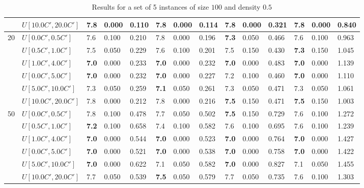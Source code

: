 \begin{table}[h]
{\begin{tabular}{|l|l||l|l|l||l|l|l||l|l|l||l|l|l|}
       & $U[10.0C',20.0C']$ & \textbf{7.8} & 0.000 & 0.110 & \textbf{7.8} & 0.000 & 0.114 & \textbf{7.8} & 0.000 & 0.321 & \textbf{7.8} & 0.000 & 0.840 \\
      \hline\hline
      \multirow{6}{*}{20} & $U[0.0C',0.5C']$ & 7.6 & 0.100 & 0.210 & 7.8 & 0.000 & 0.196 & \textbf{7.3} & 0.050 & 0.466 & 7.6 & 0.100 & 0.963 \\
       & $U[0.5C',1.0C']$ & 7.5 & 0.050 & 0.229 & 7.6 & 0.100 & 0.201 & 7.5 & 0.150 & 0.430 & \textbf{7.3} & 0.150 & 1.045 \\
       & $U[1.0C',4.0C']$ & \textbf{7.0} & 0.000 & 0.233 & \textbf{7.0} & 0.000 & 0.232 & \textbf{7.0} & 0.000 & 0.483 & \textbf{7.0} & 0.000 & 1.139 \\
       & $U[0.0C',5.0C']$ & \textbf{7.0} & 0.000 & 0.232 & \textbf{7.0} & 0.000 & 0.227 & 7.2 & 0.100 & 0.460 & \textbf{7.0} & 0.000 & 1.110 \\
       & $U[5.0C',10.0C']$ & 7.3 & 0.050 & 0.259 & \textbf{7.1} & 0.050 & 0.261 & 7.3 & 0.050 & 0.471 & 7.3 & 0.050 & 1.061 \\
       & $U[10.0C',20.0C']$ & 7.8 & 0.000 & 0.212 & 7.8 & 0.000 & 0.216 & \textbf{7.5} & 0.150 & 0.471 & \textbf{7.5} & 0.150 & 1.003 \\
      \hline\hline
      \multirow{6}{*}{50} & $U[0.0C',0.5C']$ & 7.8 & 0.100 & 0.478 & 7.7 & 0.050 & 0.502 & \textbf{7.5} & 0.150 & 0.729 & 7.6 & 0.100 & 1.272 \\
       & $U[0.5C',1.0C']$ & \textbf{7.2} & 0.100 & 0.658 & 7.4 & 0.100 & 0.582 & 7.6 & 0.100 & 0.695 & 7.6 & 0.100 & 1.239 \\
       & $U[1.0C',4.0C']$ & \textbf{7.0} & 0.000 & 0.544 & \textbf{7.0} & 0.000 & 0.523 & \textbf{7.0} & 0.000 & 0.764 & \textbf{7.0} & 0.000 & 1.427 \\
       & $U[0.0C',5.0C']$ & \textbf{7.0} & 0.000 & 0.521 & \textbf{7.0} & 0.000 & 0.538 & \textbf{7.0} & 0.000 & 0.758 & \textbf{7.0} & 0.000 & 1.422 \\
       & $U[5.0C',10.0C']$ & \textbf{7.0} & 0.000 & 0.622 & 7.1 & 0.050 & 0.582 & \textbf{7.0} & 0.000 & 0.827 & 7.1 & 0.050 & 1.455 \\
       & $U[10.0C',20.0C']$ & 7.7 & 0.050 & 0.539 & \textbf{7.5} & 0.050 & 0.579 & 7.7 & 0.050 & 0.735 & 7.6 & 0.100 & 1.303 \\
      \hline
      \end{tabular}
      }
      \caption{Results for a set of 5 instances of size $100$ and density $0.5$}
      \label{tab:pcpn100}\end{table}


